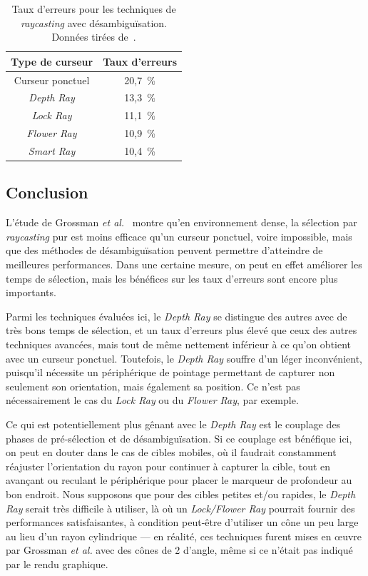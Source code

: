 	\begin{table}
	\centering
	\begin{tabular}{c c}
		Type de curseur			& Taux d'erreurs \bigstrut[b] \\ \hline
		Curseur ponctuel		& 20,7~\%{} \bigstrut[t] \\
		\emph{Depth Ray}		& 13,3~\%{} \\
		\emph{Lock Ray}			& 11,1~\%{} \\
		\emph{Flower Ray}		& 10,9~\%{} \\
		\emph{Smart Ray}		& 10,4~\%{} \\
	\end{tabular}
	\caption[Taux d'erreurs pour les techniques de \emph{raycasting} avec désambiguïsation]{Taux d'erreurs pour les techniques de \emph{raycasting} avec désambiguïsation. Données tirées de~\cite{grossman2006design}.}
	\label{tab:rayErrors}
	\end{table}
	
	\subsection{Conclusion}
	L'étude de Grossman \emph{et al.}~\cite{grossman2006design} montre qu'en environnement dense, la sélection par \emph{raycasting} pur est moins efficace qu'un curseur ponctuel, voire impossible, mais que des méthodes de désambiguïsation peuvent permettre d'atteindre de meilleures performances. Dans une certaine mesure, on peut en effet améliorer les temps de sélection, mais les bénéfices sur les taux d'erreurs sont encore plus importants.
	
	Parmi les techniques évaluées ici, le \emph{Depth Ray} se distingue des autres avec de très bons temps de sélection, et un taux d'erreurs plus élevé que ceux des autres techniques avancées, mais tout de même nettement inférieur à ce qu'on obtient avec un curseur ponctuel. Toutefois, le \emph{Depth Ray} souffre d'un léger inconvénient, puisqu'il nécessite un périphérique de pointage permettant de capturer non seulement son orientation, mais également sa position. Ce n'est pas nécessairement le cas du \emph{Lock Ray} ou du \emph{Flower Ray}, par exemple.
	
	Ce qui est potentiellement plus gênant avec le \emph{Depth Ray} est le couplage des phases de pré-sélection et de désambiguïsation. Si ce couplage est bénéfique ici, on peut en douter dans le cas de cibles mobiles, où il faudrait constamment réajuster l'orientation du rayon pour continuer à \og capturer \fg{} la cible, tout en avançant ou reculant le périphérique pour placer le marqueur de profondeur au bon endroit. Nous supposons que pour des cibles petites et/ou rapides, le \emph{Depth Ray} serait très difficile à utiliser, là où un \emph{Lock/Flower Ray} pourrait fournir des performances satisfaisantes, à condition peut-être d'utiliser un cône un peu large au lieu d'un rayon cylindrique --- en réalité, ces techniques furent mises en \oe{}uvre par Grossman \emph{et al.} avec des cônes de 2\textdegree{} d'angle, même si ce n'était pas indiqué par le rendu graphique.
	
